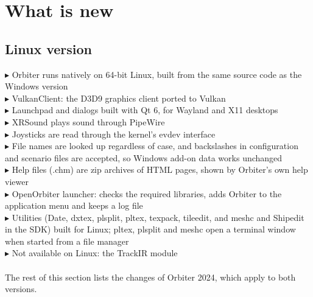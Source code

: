 \documentclass[Orbiter User Manual.tex]{subfiles}
\begin{document}
\section{What is new}

\subsection{Linux version}
$\blacktriangleright$ Orbiter runs natively on 64-bit Linux, built from the same source code as the Windows version\\
$\blacktriangleright$ VulkanClient: the D3D9 graphics client ported to Vulkan\\
$\blacktriangleright$ Launchpad and dialogs built with Qt 6, for Wayland and X11 desktops\\
$\blacktriangleright$ XRSound plays sound through PipeWire\\
$\blacktriangleright$ Joysticks are read through the kernel's evdev interface\\
$\blacktriangleright$ File names are looked up regardless of case, and backslashes in configuration and scenario files are accepted, so Windows add-on data works unchanged\\
$\blacktriangleright$ Help files (.chm) are zip archives of HTML pages, shown by Orbiter's own help viewer\\
$\blacktriangleright$ OpenOrbiter launcher: checks the required libraries, adds Orbiter to the application menu and keeps a log file\\
$\blacktriangleright$ Utilities (Date, dxtex, plsplit, pltex, texpack, tileedit, and meshc and Shipedit in the SDK) built for Linux; pltex, plsplit and meshc open a terminal window when started from a file manager\\
$\blacktriangleright$ Not available on Linux: the TrackIR module\\
\\
The rest of this section lists the changes of Orbiter 2024, which apply to both versions.
\end{document}

